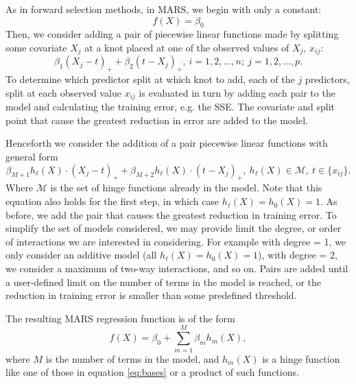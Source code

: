 \documentclass[12pt]{article}
\begin{document}
As in forward selection methods, in MARS,  we begin with only a constant:
\begin{equation}
  f(X) = \beta_{0}
\end{equation}
Then, we consider adding a pair of piecewise linear functions made by splitting some covariate $X_{j}$ at a knot placed at one of the observed values of $X_{j}$, $x_{ij}$:
\begin{equation}
\beta_{1} (X_{j} - t)_{+} + \beta_{2}(t - X_{j})_{+}, \ i = 1, 2, \ldots, n; \ j = 1, 2, \ldots, p.
\end{equation}
To determine which predictor split at which knot to add, each of the $j$ predictors, split at each observed value $x_{ij}$ is evaluated in turn by adding each pair to the model and calculating the training error, e.g. the SSE. The covariate and split point that cause the greatest reduction in error are added to the model.

Henceforth we consider the addition of a pair piecewise linear functions with general form
\begin{equation} \label{eq:gen-pairs-add}
  \beta_{M + 1} h_{\ell}(X) \cdot (X_{j} - t)_{+} + \beta_{M + 2} h_{\ell}(X) \cdot (t - X_{j})_{+}, \ h_{\ell}(X) \in \mathcal{M}, \ t \in \{x_{ij}\}.
\end{equation}
Where $\mathcal{M}$ is the set of hinge functions already in the model. Note that this equation also holds for the first step, in which case $h_{\ell}(X) = h_{0}(X) = 1$. As before, we add the pair that causes the greatest reduction in training error. To simplify the set of models considered, we may provide limit the degree, or order of interactions we are interested in considering. For example with degree = 1, we only consider an additive model (all $h_{\ell}(X) = h_{0}(X) = 1$), with degree = 2, we consider a maximum of two-way interactions, and so on.
Pairs are added until a user-defined limit on the number of terms in the model is reached, or the reduction in training error is smaller than some predefined threshold.

The resulting MARS regression function is of the form
\begin{equation}
  f(X) = \beta_{0} + \sum_{m = 1}^{M} \beta_{m} h_{m}(X),
\end{equation}
where $M$ is the number of terms in the model, and $h_{m}(X)$ is a hinge function like one of those in equation \ref{eq:bases} or a product of such functions.

\end{document}

